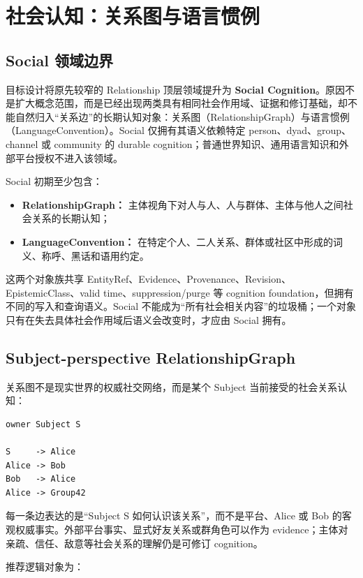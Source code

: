 \chapter{社会认知：关系图与语言惯例}

\section{Social 领域边界}

目标设计将原先较窄的 Relationship 顶层领域提升为 \textbf{Social Cognition}。原因不是扩大概念范围，而是已经出现两类具有相同社会作用域、证据和修订基础，却不能自然归入“关系边”的长期认知对象：关系图（RelationshipGraph）与语言惯例（LanguageConvention）。Social 仅拥有其语义依赖特定 person、dyad、group、channel 或 community 的 durable cognition；普通世界知识、通用语言知识和外部平台授权不进入该领域。

Social 初期至少包含：

\begin{itemize}
\item \textbf{RelationshipGraph：} 主体视角下对人与人、人与群体、主体与他人之间社会关系的长期认知；
\item \textbf{LanguageConvention：} 在特定个人、二人关系、群体或社区中形成的词义、称呼、黑话和语用约定。
\end{itemize}

这两个对象族共享 EntityRef、Evidence、Provenance、Revision、EpistemicClass、valid time、suppression/purge 等 cognition foundation，但拥有不同的写入和查询语义。Social 不能成为“所有社会相关内容”的垃圾桶；一个对象只有在失去具体社会作用域后语义会改变时，才应由 Social 拥有。

\section{Subject-perspective RelationshipGraph}

关系图不是现实世界的权威社交网络，而是某个 Subject 当前接受的社会关系认知：

\begin{verbatim}
owner Subject S

S     -> Alice
Alice -> Bob
Bob   -> Alice
Alice -> Group42
\end{verbatim}

每一条边表达的是“Subject S 如何认识该关系”，而不是平台、Alice 或 Bob 的客观权威事实。外部平台事实、显式好友关系或群角色可以作为 evidence；主体对亲疏、信任、敌意等社会关系的理解仍是可修订 cognition。

推荐逻辑对象为：

